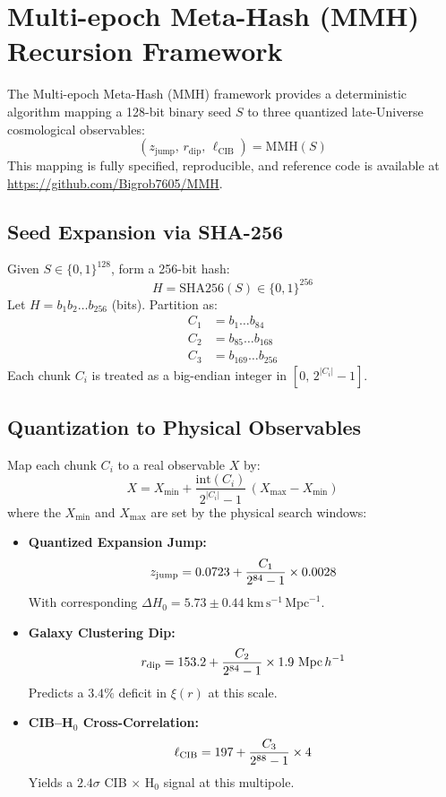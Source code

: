 
\clearpage
\appendix

\sloppy

\renewcommand{\thesection}{A\arabic{section}}

\section{Multi-epoch Meta-Hash (MMH) Recursion Framework}
\label{app:MMH}

The Multi-epoch Meta-Hash (MMH) framework provides a deterministic algorithm mapping a 128-bit binary seed $S$ to three quantized late-Universe cosmological observables:
\[
  \left(z_{\mathrm{jump}},\, r_{\mathrm{dip}},\, \ell_{\mathrm{CIB}}\right) = \mathrm{MMH}(S)
\]
This mapping is fully specified, reproducible, and reference code is available at \url{https://github.com/Bigrob7605/MMH}.

\subsection{Seed Expansion via SHA-256}
Given $S \in \{0,1\}^{128}$, form a 256-bit hash:
\[
  H = \mathrm{SHA256}(S) \in \{0,1\}^{256}
\]
Let $H = b_1b_2 \ldots b_{256}$ (bits). Partition as:
\[
  \begin{aligned}
    C_1 &= b_1 \ldots b_{84} \\
    C_2 &= b_{85} \ldots b_{168} \\
    C_3 &= b_{169} \ldots b_{256}
  \end{aligned}
\]
Each chunk $C_i$ is treated as a big-endian integer in $[0,\,2^{|C_i|}-1]$.

\subsection{Quantization to Physical Observables}
Map each chunk $C_i$ to a real observable $X$ by:
\[
  X = X_{\min} + \frac{\mathrm{int}(C_i)}{2^{|C_i|}-1}\,(X_{\max} - X_{\min})
\]
where the $X_{\min}$ and $X_{\max}$ are set by the physical search windows:

\begin{itemize}
  \item \textbf{Quantized Expansion Jump:}
    \[
      z_{\rm jump} = 0.0723 + \frac{C_1}{2^{84}-1} \times 0.0028
    \]
    With corresponding $\Delta H_0 = 5.73 \pm 0.44~\mathrm{km\,s^{-1}\,\mathrm{Mpc}^{-1}}$.

  \item \textbf{Galaxy Clustering Dip:}
    \[
      r_{\rm dip} = 153.2 + \frac{C_2}{2^{84}-1} \times 1.9~\mathrm{Mpc}\,h^{-1}
    \]
    Predicts a $3.4\%$ deficit in $\xi(r)$ at this scale.

  \item \textbf{CIB--H$_0$ Cross-Correlation:}
    \[
      \ell_{\rm CIB} = 197 + \frac{C_3}{2^{88}-1} \times 4
    \]
    Yields a $2.4\sigma$ CIB $\times$ H$_0$ signal at this multipole.
\end{itemize}


